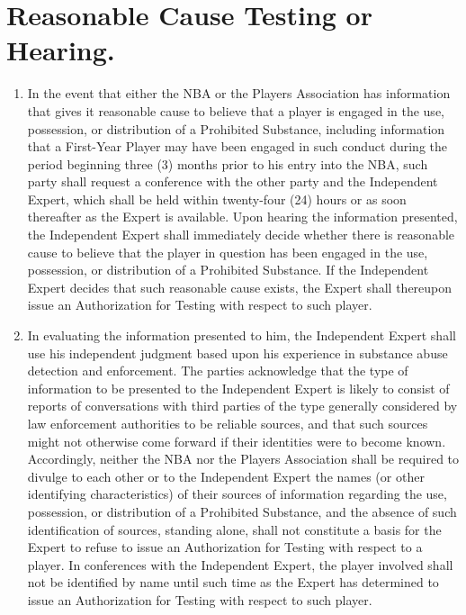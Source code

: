 \documentclass[
]{book}
\providecommand{\tightlist}{%
  \setlength{\itemsep}{0pt}\setlength{\parskip}{0pt}}
\begin{document}
\hypertarget{reasonable-cause-testing-or-hearing.}{%
\section{Reasonable Cause Testing or Hearing.}\label{reasonable-cause-testing-or-hearing.}}

\begin{enumerate}
\def\labelenumi{(\alph{enumi})}
\tightlist
\item
  In the event that either the NBA or the Players Association has information that gives it reasonable cause to believe that a player is engaged in the use, possession, or distribution of a Prohibited Substance, including information that a First-Year Player may have been engaged in such conduct during the period beginning three (3) months prior to his entry into the NBA, such party shall request a conference with the other party and the Independent Expert, which shall be held within twenty-four (24) hours or as soon thereafter as the Expert is available. Upon hearing the information presented, the Independent Expert shall immediately decide whether there is reasonable cause to believe that the player in question has been engaged in the use, possession, or distribution of a Prohibited Substance. If the Independent Expert decides that such reasonable cause exists, the Expert shall thereupon issue an Authorization for Testing with respect to such player.
\item
  In evaluating the information presented to him, the Independent Expert shall use his independent judgment based upon his experience in substance abuse detection and enforcement. The parties acknowledge that the type of information to be presented to the Independent Expert is likely to consist of reports of conversations with third parties of the type generally considered by law enforcement authorities to be reliable sources, and that such sources might not otherwise come forward if their identities were to become known. Accordingly, neither the NBA nor the Players Association shall be required to divulge to each other or to the Independent Expert the names (or other identifying characteristics) of their sources of information regarding the use, possession, or distribution of a Prohibited Substance, and the absence of such identification of sources, standing alone, shall not constitute a basis for the Expert to refuse to issue an Authorization for Testing with respect to a player. In conferences with the Independent Expert, the player involved shall not be identified by name until such time as the Expert has determined to issue an Authorization for Testing with respect to such player.

\end{enumerate}
\end{document}
